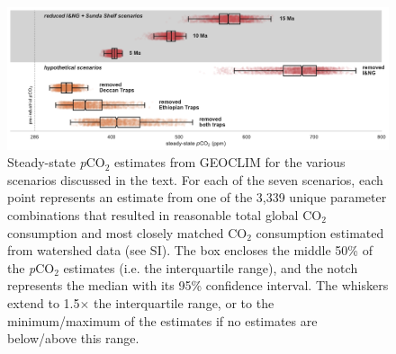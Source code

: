 \documentclass[11pt,letterpaper]{article}
\newcommand{\pCOtwo}{\textit{p}CO$_{2}$\xspace}
\newcommand{\COtwo}{CO$_{2}$\xspace}
\begin{document}
\begin{figure}[h!]
    \centering
    \includegraphics[width=1\textwidth]{Figures/scenario_pCO2.pdf}
    \caption{Steady-state \pCOtwo estimates from GEOCLIM for the various scenarios discussed in the text. For each of the seven scenarios, each point represents an estimate from one of the 3,339 unique parameter combinations that resulted in reasonable total global \COtwo consumption and most closely matched \COtwo consumption estimated from watershed data (see SI). The box encloses the middle 50\% of the \pCOtwo estimates (i.e. the interquartile range), and the notch represents the median with its 95\% confidence interval. The whiskers extend to 1.5$\times$ the interquartile range, or to the minimum/maximum of the estimates if no estimates are below/above this range.}
    \label{fig:scenario_pCO2}
\end{figure}

\clearpage
\newpage
\footnotesize

\singlespacing



\end{document}
